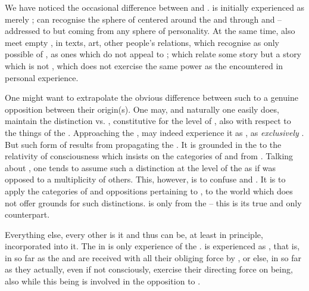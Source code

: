 
\pa\label{pa:dissociateUp}
We have noticed the occasional difference between 
and .   is initially experienced as merely
;  can recognise the sphere of
 centered around the  and 
through  and  -- addressed to  but coming from
 any sphere of  personality.  At the same time, 
also meet empty , in texts, art, other people's relations,
which  recognise as only possible  of
, as ones which do not appeal to ; 
which relate some  story but a story which is not
, which does not exercise the same  power as
the  encountered in  personal experience.

One might want to extrapolate the obvious difference between such
 to a genuine opposition between their origin(s).  One may, and
naturally one easily does, maintain the distinction  vs.
, constitutive for the level of , also with respect to
the  things of the .  Approaching the ,
 may indeed experience it as , as {\em exclusively} .
But such form of  results from propagating  the
. It is grounded in the  to the
relativity of  consciousness which insists on the categories of
 and   from .  Talking
about , one tends to assume such a distinction at the level of the
 as if  was opposed to a multiplicity of
others.  This, however, is to confuse  and .  It is to
apply the categories of  and oppositions pertaining to
, to the  world which does not offer
grounds for such distinctions.   is  only from the
 -- this is its true and only counterpart.


Everything else, every other  is  it and
thus can be, at least in principle, incorporated into it. The
 in  is only  experience of the
.   is  experienced
as , that is, in so far as the  and 
are received with all their obliging force by , or else, in
so far as they actually, even if not consciously, exercise their
directing force on  being, also while this being is involved in the
opposition to .

